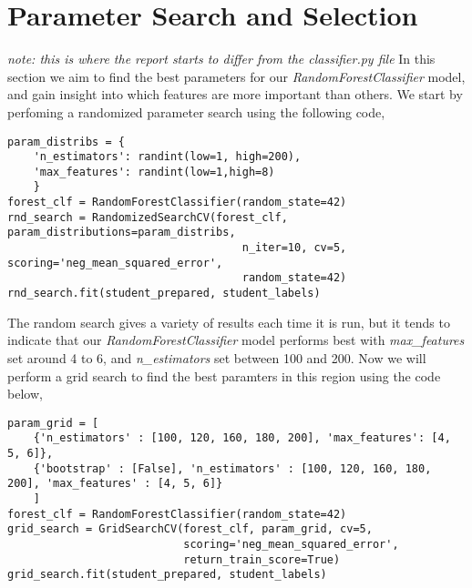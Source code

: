 \documentclass[8pt]{article}
\begin{document}
\section{Parameter Search and Selection}
\textit{note: this is where the report starts to differ from the classifier.py file}
\newline
In this section we aim to find the best parameters for our \textit{RandomForestClassifier} model, and gain insight into which features are more important than others. We start by perfoming a randomized parameter search using the following code,
\newline
\newline
\begin{adjustbox}{max width=\textwidth}
\begin{lstlisting}
param_distribs = {
    'n_estimators': randint(low=1, high=200),
    'max_features': randint(low=1,high=8)
    }
forest_clf = RandomForestClassifier(random_state=42)
rnd_search = RandomizedSearchCV(forest_clf, param_distributions=param_distribs,
                                    n_iter=10, cv=5, scoring='neg_mean_squared_error',
                                    random_state=42)
rnd_search.fit(student_prepared, student_labels)
\end{lstlisting}
\end{adjustbox}
\newline
\newline
The random search gives a variety of results each time it is run, but it tends to indicate that our \textit{RandomForestClassifier} model performs best with \textit{max\_features} set around 4 to 6, and \textit{n\_estimators} set between 100 and 200. Now we will perform a grid search to find the best paramters in this region using the code below,
\newline
\newline
\begin{adjustbox}{max width=\textwidth}
\begin{lstlisting}
param_grid = [
    {'n_estimators' : [100, 120, 160, 180, 200], 'max_features': [4, 5, 6]},
    {'bootstrap' : [False], 'n_estimators' : [100, 120, 160, 180, 200], 'max_features' : [4, 5, 6]}
    ]
forest_clf = RandomForestClassifier(random_state=42)
grid_search = GridSearchCV(forest_clf, param_grid, cv=5,
                           scoring='neg_mean_squared_error',
                           return_train_score=True)
grid_search.fit(student_prepared, student_labels)
\end{lstlisting}
\end{adjustbox}
\end{document}
